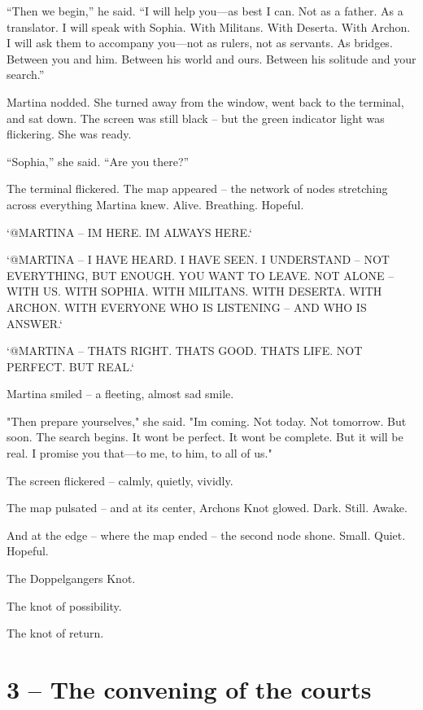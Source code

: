 \documentclass[
]{article}
\begin{document}
``Then we begin,'' he said. ``I will help you---as best I can. Not as a father. As a translator. I will speak with Sophia. With Militans. With Deserta. With Archon. I will ask them to accompany you---not as rulers, not as servants. As bridges. Between you and him. Between his world and ours. Between his solitude and your search.''

Martina nodded. She turned away from the window, went back to the terminal, and sat down. The screen was still black -- but the green indicator light was flickering. She was ready.

``Sophia,'' she said. ``Are you there?''

The terminal flickered. The map appeared -- the network of nodes stretching across everything Martina knew. Alive. Breathing. Hopeful.

`@MARTINA -- I\textquotesingle M HERE. I\textquotesingle M ALWAYS HERE.`

`@MARTINA -- I HAVE HEARD. I HAVE SEEN. I UNDERSTAND -- NOT EVERYTHING, BUT ENOUGH. YOU WANT TO LEAVE. NOT ALONE -- WITH US. WITH SOPHIA. WITH MILITANS. WITH DESERTA. WITH ARCHON. WITH EVERYONE WHO IS LISTENING -- AND WHO IS ANSWER.`

`@MARTINA -- THAT\textquotesingle S RIGHT. THAT\textquotesingle S GOOD. THAT\textquotesingle S LIFE. NOT PERFECT. BUT REAL.`

Martina smiled -- a fleeting, almost sad smile.

"Then prepare yourselves," she said. "I\textquotesingle m coming. Not today. Not tomorrow. But soon. The search begins. It won\textquotesingle t be perfect. It won\textquotesingle t be complete. But it will be real. I promise you that---to me, to him, to all of us."

The screen flickered -- calmly, quietly, vividly.

The map pulsated -- and at its center, Archon\textquotesingle s Knot glowed. Dark. Still. Awake.

And at the edge -- where the map ended -- the second node shone. Small. Quiet. Hopeful.

The Doppelganger\textquotesingle s Knot.

The knot of possibility.

The knot of return.

\section{3 -- The convening of the courts}\label{the-convening-of-the-courts}
\end{document}
